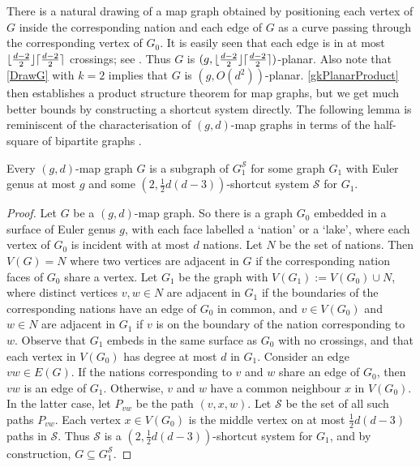 \documentclass{patmorin}
\DeclarePairedDelimiter{\ceil}{\lceil}{\rceil}
\DeclarePairedDelimiter{\floor}{\lfloor}{\rfloor}
\renewcommand{\SS}{\mathcal{S}}
\begin{document}
There is a natural drawing of a map graph obtained by positioning each vertex of $G$ inside the corresponding nation and each edge of $G$ as a curve passing through the corresponding vertex of $G_0$. It is easily seen that each edge is in at most $\floor{\frac{d-2}{2}}\ceil{\frac{d-2}{2}}$ crossings; see \citep{dujmovic.eppstein.ea:structure}. Thus $G$ is $(g,\floor{\frac{d-2}{2}}\ceil{\frac{d-2}{2}})$-planar. Also note that \cref{DrawG} with $k=2$ implies that $G$ is $(g, O(d^{2}) )$-planar. \cref{gkPlanarProduct} then establishes a product structure theorem for map graphs, but we get much better bounds by constructing a shortcut system directly.  The following lemma is reminiscent of the characterisation of $(g,d)$-map graphs in terms of the half-square of bipartite graphs \citep{CGP02,dujmovic.eppstein.ea:structure}.

\begin{lem}
\label{MapShortcut}
Every $(g,d)$-map graph $G$ is a subgraph of $G_1^\SS$ for some graph $G_1$ with Euler genus at most $g$ and some $(2,\tfrac12 d(d-3) )$-shortcut system $\SS$ for $G_1$.
\end{lem}

\begin{proof}
Let $G$ be a $(g,d)$-map graph. So there is a graph $G_0$ embedded in a surface of Euler genus $g$, with each face labelled a `nation' or a `lake', where each vertex of $G_0$ is incident with at most $d$ nations. Let $N$ be the set of nations. Then $V(G)=N$ where two vertices are adjacent in $G$ if the corresponding nation faces of $G_0$ share a vertex. Let $G_1$ be the graph with $V(G_1):=V(G_0) \cup N$, where distinct vertices $v,w\in N$ are adjacent in $G_1$ if the boundaries of the corresponding nations have an edge of $G_0$ in common, and $v\in V(G_0)$ and $w\in N$ are adjacent in $G_1$ if $v$ is on the boundary of the nation corresponding to $w$. Observe that $G_1$ embeds in the same surface as $G_0$ with no crossings, and that each vertex in $V(G_0)$ has degree at most $d$ in $G_1$. Consider an edge $vw\in E(G)$. If the nations corresponding to $v$ and $w$ share an edge of $G_0$, then $vw$ is an edge of $G_1$. Otherwise,  $v$ and $w$ have a common neighbour $x$ in $V(G_0)$. In the latter case, let $P_{vw}$ be the path $(v,x,w)$. Let $\SS$ be the set of all such paths $P_{vw}$. Each vertex $x\in V(G_0)$ is the middle vertex on at most $\tfrac12 d(d-3)$  paths in $\SS$. Thus $\SS$ is a $(2,\tfrac12 d(d-3))$-shortcut system for $G_1$, and by construction, $G \subseteq G_1^\SS$.
\end{proof}
\end{document}
